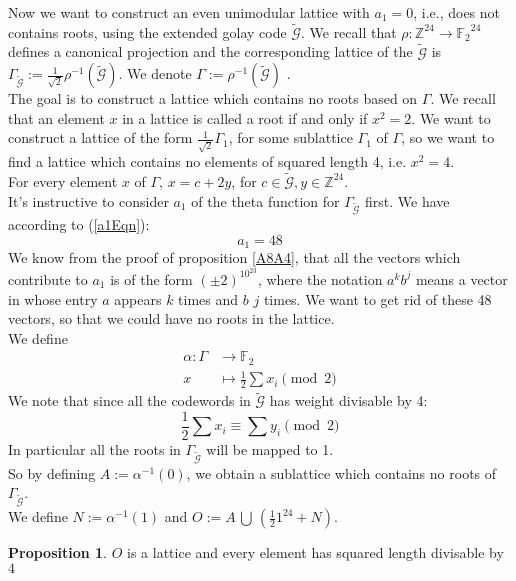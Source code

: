 \documentclass[12pt]{article}
\theoremstyle{definition}
\newtheorem{prop}[theorem]{Proposition}
\numberwithin{equation}{theorem}
\numberwithin{figure}{theorem}
\newcommand{\Ftwo}{\ensuremath{\mathbb{F}_2}}
\newcommand{\cCodes}{\ensuremath{\widetilde{\mathcal{G}}}}
\newcommand{\buildLattice}[1]{\ensuremath{\Gamma_{#1}}}
\newcommand{\Integer}{\ensuremath{\mathbb{Z}}}
\begin{document}
Now we want to construct an even unimodular lattice with $a_1 = 0$, i.e., does not contains roots, using the extended golay code {\cCodes}.
We recall that $\rho :\Integer^{24} \rightarrow \Ftwo^{24}$ defines a canonical projection and the corresponding lattice of the {\cCodes} is $\buildLattice{\cCodes} := \frac{1}{\sqrt{2}}\rho^{-1}(\cCodes)$. We denote $\Gamma := \rho^{-1}(\cCodes)$ .\\ The goal is to construct a lattice which contains no roots based on $\Gamma$. We recall that an element $x$ in a lattice is called a root if and only if $x^2 = 2$. We want to construct a lattice of the form $\frac{1}{\sqrt{2}}\Gamma_1$, for some sublattice $\Gamma_1$ of $\Gamma$, so we want to find a lattice which contains no elements of squared length 4, i.e. $x^2 = 4$. \\For every element $x$ of $\Gamma$, $x = c + 2y$, for $c \in \cCodes , y\in \Integer^{24}$. \\
It's instructive to consider $a_1$ of the theta function for $\buildLattice{\cCodes}$ first. We have according to (\ref{a1Eqn}):
\[
	a_1 = 48
\]
We know from the proof of proposition \ref{A8A4}, that all the vectors which contribute to $a_1$ is of the form $(\pm2)^10^{23}$, where the notation $a^kb^j$ means a vector in whose entry $a$ appears $k$ times and $b$ $j$ times. We want to get rid of these 48 vectors, so that we could have no roots in the lattice. \\
We define
\begin{align*}
	\alpha: \Gamma &\rightarrow \Ftwo \\
			x &\mapsto \frac{1}{2}\sum{x_i} \pmod 2
\end{align*}
We note that since all the codewords in $\cCodes$ has weight divisable by 4:
\[
\frac{1}{2} \sum{x_i} \equiv \sum{y_i} \pmod 2
\]
In particular all the roots in $\buildLattice{\cCodes}$ will be mapped to 1.\\
So by defining $A:= \alpha^{-1}(0)$, we obtain a sublattice which contains no roots of  $\buildLattice{\cCodes}$. \\
We define $N := \alpha^{-1}(1)$ and $O := A \, \bigcup \,(\frac{1}{2}1^{24} + N)$.
\begin{prop}\label{propLeechPreliminary}
$O$ is a lattice and every element has squared length divisable by $4$
\end{prop}
\end{document}
